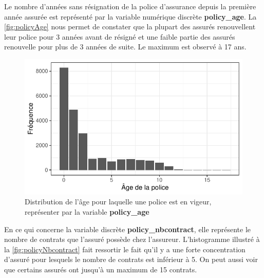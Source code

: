 \documentclass[
]{article}
\begin{document}
Le nombre d'années sans résignation de la police d'assurance depuis la
première année assurée est représenté par la variable numérique discrète
\textbf{policy\_age}. La \autoref{fig:policyAge} nous permet de
constater que la plupart des assurés renouvellent leur police pour 3
années avant de résigné et une faible partie des assurés renouvelle pour
plus de 3 années de suite. Le maximum est observé à 17 ans.

\begin{figure}

{\centering \includegraphics{01-Rapport_files/figure-latex/graph_policy_age-1} 

}

\caption{\label{fig:policyAge}Distribution de l'âge pour laquelle une police est en vigeur, représenter par la variable \textbf{policy\_age}}\label{fig:graph_policy_age}
\end{figure}

En ce qui concerne la variable discrète \textbf{policy\_nbcontract},
elle représente le nombre de contrats que l'assuré possède chez
l'assureur. L'histogramme illustré à la \autoref{fig:policyNbcontract}
fait ressortir le fait qu'il y a une forte concentration d'assuré pour
lesquels le nombre de contrats est inférieur à 5. On peut aussi voir que
certains assurés ont jusqu'à un maximum de 15 contrats.
\end{document}
